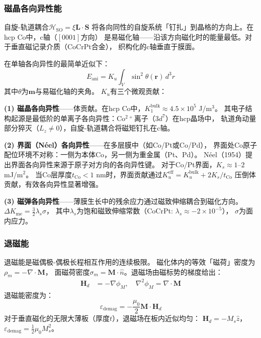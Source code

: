 \documentclass[11pt,a4paper,openany]{book}
\theoremstyle{definition}
\theoremstyle{plain}
\theoremstyle{remark}
\begin{document}
\subsubsection{磁晶各向异性能}

自旋-轨道耦合$\mathcal{H}_{\text{SO}} = \xi \mathbf{L}\cdot\mathbf{S}$
将各向同性的自旋系统「钉扎」到晶格的方向上。在hcp Co中，c轴（$[0001]$方向）
是易磁化轴——沿该方向磁化时的能量最低。对于垂直磁记录介质（CoCrPt合金），
织构化的c轴垂直于膜面。

在单轴各向异性的最简单近似下：
\begin{equation}\label{eq:anisotropy}
  E_{\text{ani}} = K_u\int_V \sin^2\theta(\mathbf{r})\,d^3r
\end{equation}
其中$\theta$为$\mathbf{m}$与易磁化轴的夹角。
$K_u$有三个微观贡献：

\textbf{(1) 磁晶各向异性}——体贡献。在hcp Co中，$K_1^{\text{bulk}} \approx 4.5 \times 10^5$ J/m$^3$。
其电子结构起源是最低阶的单离子各向异性：Co$^{2+}$离子（$3d^7$）在hcp晶场中，
轨道角动量部分猝灭（$L_z \neq 0$），自旋-轨道耦合将磁矩钉扎在c轴。

\textbf{(2) 界面（N\'{e}el）各向异性}——在多层膜中（如Co/Pt或Co/Pd），
界面处Co原子配位环境不对称：一侧为本体Co，另一侧为重金属（Pt、Pd）。
N\'{e}el（1954）提出界面各向异性来源于原子对方向的各向异性键。
对于Co/Pt界面，$K_s \approx 1$--$2$ mJ/m$^2$。
当Co层厚度$t_{\text{Co}} < 1$ nm时，界面贡献通过$K_u^{\text{eff}} = K_u^{\text{bulk}} + 2K_s/t_{\text{Co}}$
压倒体贡献，有效各向异性显著增强。

\textbf{(3) 磁弹各向异性}——薄膜生长中的残余应力通过磁致伸缩耦合到磁化方向。
$\Delta K_{\text{me}} = \frac{3}{2}\lambda_s\sigma$，
其中$\lambda_s$为饱和磁致伸缩常数（CoCrPt: $\lambda_s \approx -2 \times 10^{-5}$），
$\sigma$为面内应力。

\subsubsection{退磁能}

退磁能是磁偶极-偶极长程相互作用的连续极限。
磁化体内的等效「磁荷」密度为$\rho_m = -\nabla \cdot \mathbf{M}$，
面磁荷密度$\sigma_m = \mathbf{M}\cdot\hat{n}$。退磁场由磁标势的梯度给出：
\begin{align}
  \mathbf{H}_d &= -\nabla\phi_M, \quad
  \nabla^2\phi_M = \nabla\cdot\mathbf{M}
  \label{eq:poisson-mag}
\end{align}
退磁能密度为：
\begin{equation}\label{eq:demag}
  \varepsilon_{\text{demag}} = -\frac{\mu_0}{2}\mathbf{M}\cdot\mathbf{H}_d
\end{equation}
对于垂直磁化的无限大薄板（厚度$t$），退磁场在板内近似均匀：
$\mathbf{H}_d = -M_s\hat{z}$，$\varepsilon_{\text{demag}} = \frac{1}{2}\mu_0 M_s^2$。
\end{document}
